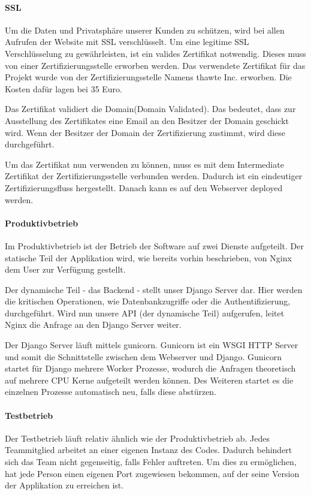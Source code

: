 \paragraph{SSL}
Um die Daten und Privatsphäre unserer Kunden zu schützen, wird bei allen Aufrufen der Website mit \gls{SSL} verschlüsselt. Um eine legitime SSL Verschlüsselung zu gewährleisten, ist ein valides Zertifikat notwendig. Dieses muss von einer Zertifizierungsstelle erworben werden. Das verwendete Zertifikat für das Projekt wurde von der Zertifizierungsstelle Namens thawte Inc. erworben.  Die Kosten dafür lagen bei 35 Euro. \cite{CERTIFICATE}

Das Zertifikat validiert die Domain(Domain Validated). Das bedeutet, dass zur Ausstellung des Zertifikates eine Email an den Besitzer der Domain geschickt wird. Wenn der Besitzer der Domain der Zertifizierung zustimmt, wird diese durchgeführt. 

Um das Zertifikat nun verwenden zu können, muss es mit dem Intermediate Zertifikat der Zertifizierungsstelle verbunden werden. Dadurch ist ein eindeutiger Zertifizierungsfluss hergestellt. Danach kann es auf den Webserver deployed werden.
   
\paragraph{Produktivbetrieb}
Im Produktivbetrieb ist der Betrieb der Software auf zwei Dienste aufgeteilt. Der statische Teil der Applikation wird, wie bereits vorhin beschrieben, von Nginx dem User zur Verfügung gestellt. 

Der dynamische Teil - das Backend - stellt unser Django Server dar. Hier werden die kritischen Operationen, wie Datenbankzugriffe oder die Authentifizierung, durchgeführt. Wird nun unsere \gls{API} (der dynamische Teil) aufgerufen, leitet Nginx die Anfrage an den Django Server weiter. \\


Der Django Server läuft mittels gunicorn. Gunicorn ist ein \gls{WSGI} HTTP Server und somit die Schnittstelle zwischen dem Webserver und Django. Gunicorn startet für Django mehrere Worker Prozesse, wodurch die Anfragen theoretisch auf mehrere CPU Kerne aufgeteilt werden können. Des Weiteren startet es die einzelnen Prozesse automatisch neu, falls diese abstürzen.
\paragraph{Testbetrieb}
Der Testbetrieb läuft relativ ähnlich wie der Produktivbetrieb ab. Jedes Teammitglied arbeitet an einer eigenen Instanz des Codes. Dadurch behindert sich das Team nicht gegenseitig, falls Fehler auftreten. Um dies zu ermöglichen, hat jede Person einen eigenen Port zugewiesen bekommen, auf der seine Version der Applikation zu erreichen ist. 

